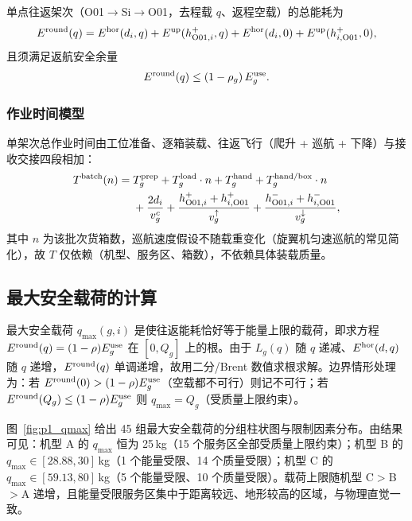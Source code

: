 单点往返架次（O01$\to$Si$\to$O01，去程载 $q$、返程空载）的总能耗为
\begin{equation}
E^{\rm round}(q) = E^{\rm hor}(d_i,q)+E^{\rm up}(h^{+}_{{\rm O01},i},q) + E^{\rm hor}(d_i,0)+E^{\rm up}(h^{+}_{i,{\rm O01}},0),
\end{equation}
且须满足返航安全余量
\begin{equation}
E^{\rm round}(q) \le (1-\rho_g)\,E^{\rm use}_g .
\end{equation}

\subsubsection{作业时间模型}

单架次总作业时间由工位准备、逐箱装载、往返飞行（爬升 + 巡航 + 下降）与接收交接四段相加：
\begin{equation}
\begin{aligned}
T^{\rm batch}(n) ={}& T^{\rm prep}_g + T^{\rm load}_g\cdot n + T^{\rm hand}_g + T^{\rm hand/box}_g\cdot n \\
&+ \frac{2d_i}{v^{c}_g} + \frac{h^{+}_{{\rm O01},i}+h^{+}_{i,{\rm O01}}}{v^{\uparrow}_g} + \frac{h^{-}_{{\rm O01},i}+h^{-}_{i,{\rm O01}}}{v^{\downarrow}_g},
\end{aligned}
\end{equation}
其中 $n$ 为该批次货箱数，巡航速度假设不随载重变化（旋翼机匀速巡航的常见简化），故 $T$ 仅依赖（机型、服务区、箱数），不依赖具体装载质量。

\subsection{最大安全载荷的计算}

最大安全载荷 $q_{\max}(g,i)$ 是使往返能耗恰好等于能量上限的载荷，即求方程 $E^{\rm round}(q)=(1-\rho)E^{\rm use}_g$ 在 $[0,Q_g]$ 上的根。由于 $L_g(q)$ 随 $q$ 递减、$E^{\rm hor}(d,q)$ 随 $q$ 递增，$E^{\rm round}(q)$ 单调递增，故用二分/Brent 数值求根求解。边界情形处理为：若 $E^{\rm round}(0)>(1-\rho)E^{\rm use}_g$（空载都不可行）则记不可行；若 $E^{\rm round}(Q_g)\le(1-\rho)E^{\rm use}_g$ 则 $q_{\max}=Q_g$（受质量上限约束）。

图~\ref{fig:p1_qmax} 给出 45 组最大安全载荷的分组柱状图与限制因素分布。由结果可见：机型 A 的 $q_{\max}$ 恒为 25\,kg（15 个服务区全部受质量上限约束）；机型 B 的 $q_{\max}\in[28.88,30]$\,kg（1 个能量受限、14 个质量受限）；机型 C 的 $q_{\max}\in[59.13,80]$\,kg（5 个能量受限、10 个质量受限）。载荷上限随机型 C$>$B$>$A 递增，且能量受限服务区集中于距离较远、地形较高的区域，与物理直觉一致。

